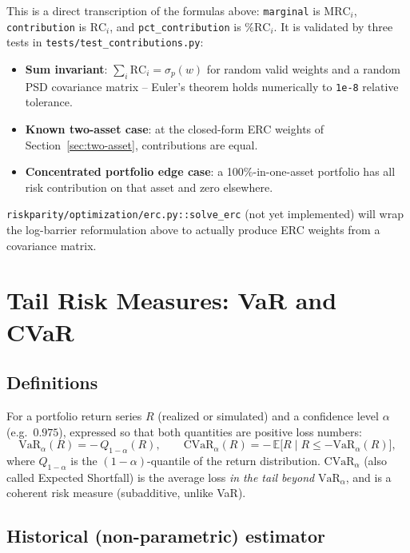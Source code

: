 \documentclass[11pt]{article}
\newcommand{\Var}{\mathrm{VaR}}
\newcommand{\CVar}{\mathrm{CVaR}}
\begin{document}
This is a direct transcription of the formulas above: \texttt{marginal}
is $\text{MRC}_i$, \texttt{contribution} is $\text{RC}_i$, and
\texttt{pct\_contribution} is $\%\text{RC}_i$. It is validated by three
tests in \texttt{tests/test\_contributions.py}:
\begin{itemize}
    \item \textbf{Sum invariant}: $\sum_i \text{RC}_i = \sigma_p(w)$ for
    random valid weights and a random PSD covariance matrix -- Euler's
    theorem holds numerically to \texttt{1e-8} relative tolerance.
    \item \textbf{Known two-asset case}: at the closed-form ERC weights
    of Section~\ref{sec:two-asset}, contributions are equal.
    \item \textbf{Concentrated portfolio edge case}: a 100\%-in-one-asset
    portfolio has all risk contribution on that asset and zero elsewhere.
\end{itemize}

\texttt{riskparity/optimization/erc.py::solve\_erc} (not yet implemented)
will wrap the log-barrier reformulation above to actually produce ERC
weights from a covariance matrix.

\section{Tail Risk Measures: VaR and CVaR}
\label{sec:var-cvar}

\subsection{Definitions}

For a portfolio return series $R$ (realized or simulated) and a
confidence level $\alpha$ (e.g.\ $0.975$), expressed so that both
quantities are positive loss numbers:
\[
\Var_\alpha(R) = -\,Q_{1-\alpha}(R), \qquad
\CVar_\alpha(R) = -\,\mathbb{E}\big[R \mid R \leq -\Var_\alpha(R)\big],
\]
where $Q_{1-\alpha}$ is the $(1-\alpha)$-quantile of the return
distribution. $\CVar_\alpha$ (also called Expected Shortfall) is the
average loss \emph{in the tail beyond} $\Var_\alpha$, and is a coherent
risk measure (subadditive, unlike VaR).

\subsection{Historical (non-parametric) estimator}
\end{document}
